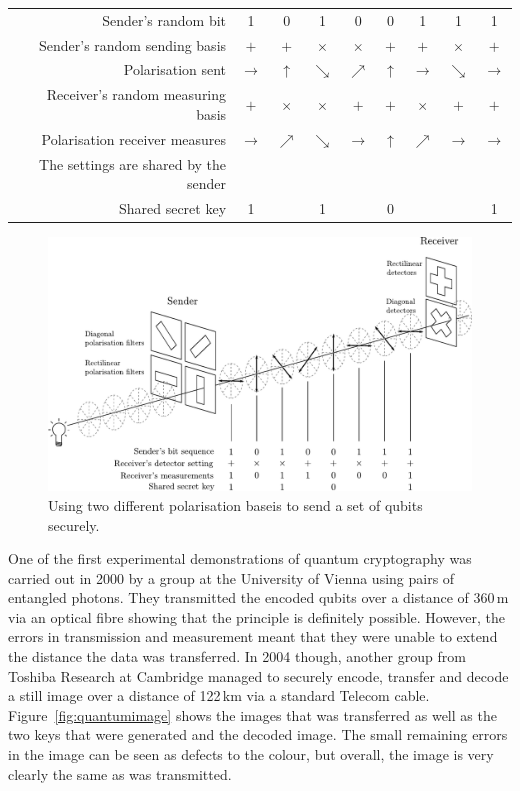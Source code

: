 \begin{table}[h!]
	\centering
	\begin{tabular}{r*{8}{c}}
		Sender's random bit & 1 & 0 & 1 & 0 & 0 & 1 & 1 & 1 \\
		Sender's random sending basis & $+$ & $+$ & $\times$ & $\times$ & $+$ & $+$ & $\times$ & $+$ \\
		Polarisation sent & $\rightarrow$ & $\uparrow$ & $\searrow$ & $\nearrow$ & $\uparrow$ & $\rightarrow$ & $\searrow$ & $\rightarrow$ \\
		Receiver's random measuring basis & $+$ & $\times$ & $\times$ & $+$ & $+$ & $\times$ & $+$ & $+$ \\
		Polarisation receiver measures & $\rightarrow$ & $\nearrow$ & $\searrow$ & $\rightarrow$ & $\uparrow$ & $\nearrow$ & $\rightarrow$ & $\rightarrow$ \\ 
		The settings are shared by the sender\\
		Shared secret key & 1 &  & 1 &  & 0 &  &  & 1
	\end{tabular}
\end{table}

\begin{figure}[ht]
	\centering
	\includegraphics[width=1.0\columnwidth]{quantumcrypto.pdf}
	\caption{Using two different polarisation baseis to send a set of qubits securely\cite{quantumcrypto}.\label{fig:quantumcrypto}}
\end{figure}

One of the first experimental demonstrations of quantum cryptography was carried out in 2000 by a group at the University of Vienna using pairs of entangled photons\cite{PhysRevLett.84.4729}. They transmitted the encoded qubits over a distance of 360\,m via an optical fibre showing that the principle is definitely possible. However, the errors in transmission and measurement meant that they were unable to extend the distance the data was transferred. In 2004 though, another group from Toshiba Research at Cambridge managed to securely encode, transfer and decode a still image over a distance of 122\,km via a standard Telecom cable\cite{gobby:3762}. Figure~\ref{fig:quantumimage} shows the images that was transferred as well as the two keys that were generated and the decoded image. The small remaining errors in the image can be seen as defects to the colour, but overall, the image is very clearly the same as was transmitted.

